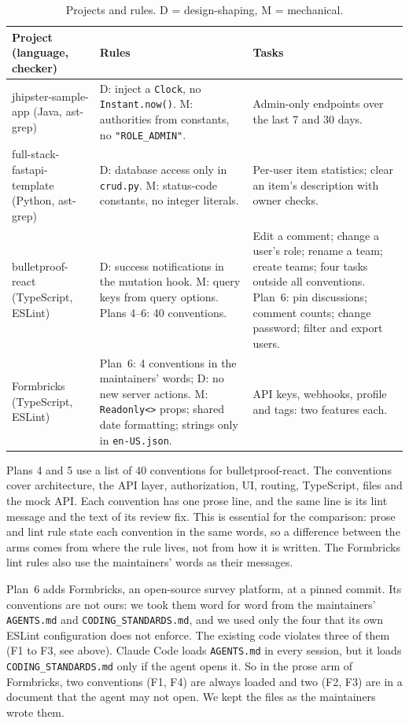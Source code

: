 \documentclass[pdflatex,sn-mathphys-num]{sn-jnl}
\newcommand{\file}[1]{\texttt{#1}}
\begin{document}
\begin{table}[!htb]
\centering
\small
\caption{Projects and rules. D = design-shaping, M = mechanical.}
\label{tab:projects}
\begin{tabularx}{\linewidth}{@{}lLL@{}}
\toprule
Project (language, checker) & Rules & Tasks \\
\midrule
jhipster-sample-app (Java, ast-grep) & D: inject a \texttt{Clock}, no \texttt{Instant.now()}. M: authorities from constants, no \texttt{"ROLE\_ADMIN"}. & Admin-only endpoints over the last 7 and 30 days. \\
full-stack-fastapi-template (Python, ast-grep) & D: database access only in \file{crud.py}. M: status-code constants, no integer literals. & Per-user item statistics; clear an item's description with owner checks. \\
bulletproof-react (TypeScript, ESLint) & D: success notifications in the mutation hook. M: query keys from query options. Plans 4--6: 40 conventions. & Edit a comment; change a user's role; rename a team; create teams; four tasks outside all conventions. Plan~6: pin discussions; comment counts; change password; filter and export users. \\
Formbricks (TypeScript, ESLint) & Plan~6: 4 conventions in the maintainers' words; D: no new server actions. M: \texttt{Readonly<>} props; shared date formatting; strings only in \texttt{en-US.json}. & API keys, webhooks, profile and tags: two features each. \\
\bottomrule
\end{tabularx}
\end{table}


Plans 4 and 5 use a list of 40 conventions for bulletproof-react.
The conventions cover architecture, the API layer, authorization, UI, routing, TypeScript, files and the mock API.
Each convention has one prose line, and the same line is its lint message and the text of its review fix.
This is essential for the comparison: prose and lint rule state each convention in the same words, so a difference between the arms comes from where the rule lives, not from how it is written.
The Formbricks lint rules also use the maintainers' words as their messages.

Plan~6 adds Formbricks, an open-source survey platform, at a pinned commit.
Its conventions are not ours: we took them word for word from the maintainers' \file{AGENTS.md} and \file{CODING\_STANDARDS.md}, and we used only the four that its own ESLint configuration does not enforce.
The existing code violates three of them (F1 to F3, see above).
Claude Code loads \file{AGENTS.md} in every session, but it loads \file{CODING\_STANDARDS.md} only if the agent opens it.
So in the prose arm of Formbricks, two conventions (F1, F4) are always loaded and two (F2, F3) are in a document that the agent may not open.
We kept the files as the maintainers wrote them.
\end{document}
